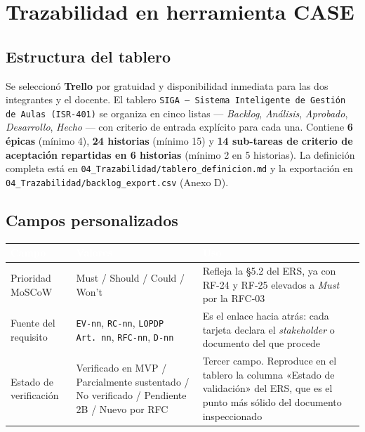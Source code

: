 \documentclass[11pt,letterpaper]{article}
\newcommand{\thead}[1]{\cellcolor{uteqverde}\textcolor{white}{\textbf{#1}}}
\begin{document}
\section{Trazabilidad en herramienta CASE}

\subsection{Estructura del tablero}
Se seleccionó \textbf{Trello} por gratuidad y disponibilidad inmediata para las dos integrantes y el docente. El tablero \texttt{SIGA --- Sistema Inteligente de Gestión de Aulas (ISR-401)} se organiza en cinco listas --- \emph{Backlog}, \emph{Análisis}, \emph{Aprobado}, \emph{Desarrollo}, \emph{Hecho} --- con criterio de entrada explícito para cada una. Contiene \textbf{6 épicas} (mínimo 4), \textbf{24 historias} (mínimo 15) y \textbf{14 sub-tareas de criterio de aceptación repartidas en 6 historias} (mínimo 2 en 5 historias). La definición completa está en \texttt{04\_Trazabilidad/tablero\_definicion.md} y la exportación en \texttt{04\_Trazabilidad/backlog\_export.csv} (Anexo D).

\subsection{Campos personalizados}
\begin{center}
\small
\begin{tabular}{|p{3.4cm}|p{4.4cm}|p{7.0cm}|}
\hline
\thead{Campo} & \thead{Valores} & \thead{Uso} \\ \hline
Prioridad MoSCoW & Must / Should / Could / Won't & Refleja la \S5.2 del ERS, ya con RF-24 y RF-25 elevados a \emph{Must} por la RFC-03 \\ \hline
Fuente del requisito & \texttt{EV-nn}, \texttt{RC-nn}, \texttt{LOPDP Art.\,nn}, \texttt{RFC-nn}, \texttt{D-nn} & Es el enlace hacia atrás: cada tarjeta declara el \emph{stakeholder} o documento del que procede \\ \hline
Estado de verificación & Verificado en MVP / Parcialmente sustentado / No verificado / Pendiente 2B / Nuevo por RFC & Tercer campo. Reproduce en el tablero la columna «Estado de validación» del ERS, que es el punto más sólido del documento inspeccionado \\ \hline
\end{tabular}
\end{center}
\end{document}
